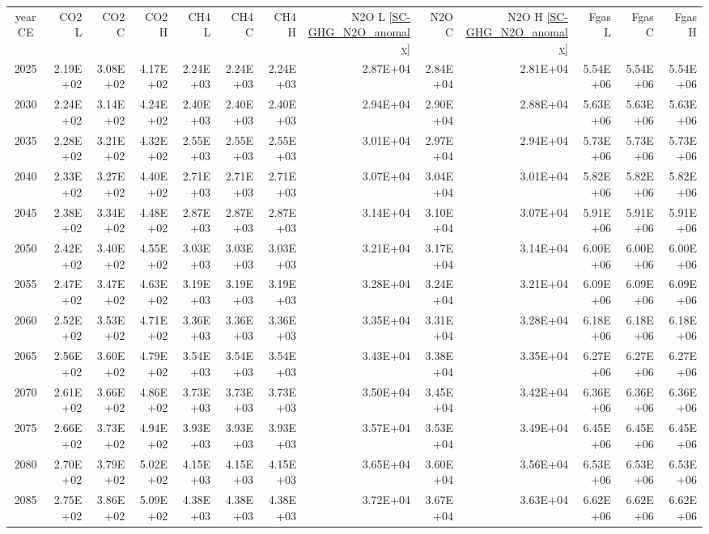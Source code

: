 \documentclass{article}
\begin{document}
\begin{table}
\begin{tabular}{crrr|rrr|rrr|rrr}
year CE  & CO2 L    & CO2 C    & CO2 H    & CH4 L    & CH4 C    & CH4 H    & N2O L \ref{SC-GHG_N2O_anomaly}     & N2O C      & N2O H \ref{SC-GHG_N2O_anomaly}    & Fgas L   & Fgas C   & Fgas H   \\
2025     & 2.19E+02 & 3.08E+02 & 4.17E+02 & 2.24E+03 & 2.24E+03 & 2.24E+03 & 2.87E+04 & 2.84E+04 & 2.81E+04 & 5.54E+06 & 5.54E+06 & 5.54E+06 \\
2030     & 2.24E+02 & 3.14E+02 & 4.24E+02 & 2.40E+03 & 2.40E+03 & 2.40E+03 & 2.94E+04 & 2.90E+04 & 2.88E+04 & 5.63E+06 & 5.63E+06 & 5.63E+06 \\
2035     & 2.28E+02 & 3.21E+02 & 4.32E+02 & 2.55E+03 & 2.55E+03 & 2.55E+03 & 3.01E+04 & 2.97E+04 & 2.94E+04 & 5.73E+06 & 5.73E+06 & 5.73E+06 \\
2040     & 2.33E+02 & 3.27E+02 & 4.40E+02 & 2.71E+03 & 2.71E+03 & 2.71E+03 & 3.07E+04 & 3.04E+04 & 3.01E+04 & 5.82E+06 & 5.82E+06 & 5.82E+06 \\
2045     & 2.38E+02 & 3.34E+02 & 4.48E+02 & 2.87E+03 & 2.87E+03 & 2.87E+03 & 3.14E+04 & 3.10E+04 & 3.07E+04 & 5.91E+06 & 5.91E+06 & 5.91E+06 \\
2050     & 2.42E+02 & 3.40E+02 & 4.55E+02 & 3.03E+03 & 3.03E+03 & 3.03E+03 & 3.21E+04 & 3.17E+04 & 3.14E+04 & 6.00E+06 & 6.00E+06 & 6.00E+06 \\
2055     & 2.47E+02 & 3.47E+02 & 4.63E+02 & 3.19E+03 & 3.19E+03 & 3.19E+03 & 3.28E+04 & 3.24E+04 & 3.21E+04 & 6.09E+06 & 6.09E+06 & 6.09E+06 \\
2060     & 2.52E+02 & 3.53E+02 & 4.71E+02 & 3.36E+03 & 3.36E+03 & 3.36E+03 & 3.35E+04 & 3.31E+04 & 3.28E+04 & 6.18E+06 & 6.18E+06 & 6.18E+06 \\
2065     & 2.56E+02 & 3.60E+02 & 4.79E+02 & 3.54E+03 & 3.54E+03 & 3.54E+03 & 3.43E+04 & 3.38E+04 & 3.35E+04 & 6.27E+06 & 6.27E+06 & 6.27E+06 \\
2070     & 2.61E+02 & 3.66E+02 & 4.86E+02 & 3.73E+03 & 3.73E+03 & 3.73E+03 & 3.50E+04 & 3.45E+04 & 3.42E+04 & 6.36E+06 & 6.36E+06 & 6.36E+06 \\
2075     & 2.66E+02 & 3.73E+02 & 4.94E+02 & 3.93E+03 & 3.93E+03 & 3.93E+03 & 3.57E+04 & 3.53E+04 & 3.49E+04 & 6.45E+06 & 6.45E+06 & 6.45E+06 \\
2080     & 2.70E+02 & 3.79E+02 & 5.02E+02 & 4.15E+03 & 4.15E+03 & 4.15E+03 & 3.65E+04 & 3.60E+04 & 3.56E+04 & 6.53E+06 & 6.53E+06 & 6.53E+06 \\
2085     & 2.75E+02 & 3.86E+02 & 5.09E+02 & 4.38E+03 & 4.38E+03 & 4.38E+03 & 3.72E+04 & 3.67E+04 & 3.63E+04 & 6.62E+06 & 6.62E+06 & 6.62E+06 \\

\end{tabular}
\end{table}
\end{document}
